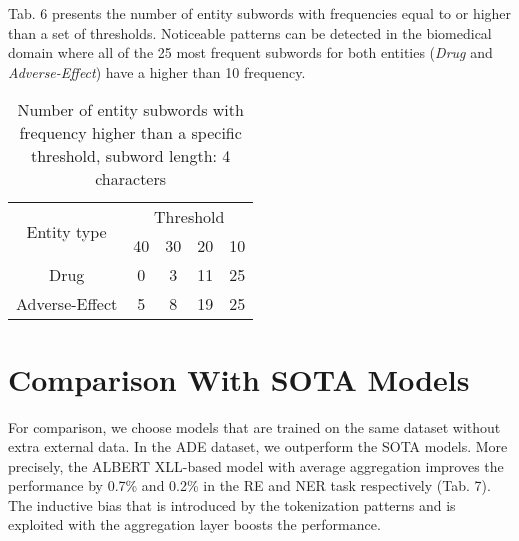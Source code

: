 \documentclass[runningheads]{llncs}
\begin{document}
Tab. 6 presents the number of entity subwords with frequencies equal to or higher than a set of thresholds. Noticeable patterns can be detected in the biomedical domain where all of the 25 most frequent subwords for both entities (\textit{Drug} and \textit{Adverse-Effect}) have a higher than 10 frequency.


\begin{table}[!h]
    \vspace{-5mm}
    \caption{Number of entity subwords with frequency higher than a specific threshold, subword length: 4 characters}
    \vspace{-3mm}
    \centering
    \begin{tabular}{ccccc}
        \toprule
        \multirow{2}{*}{Entity type} & \multicolumn{4}{c}{Threshold} \\
        \cmidrule{2-5}
        &  40 &  30 &  20 &  10 \\
        \midrule
        Drug & 0 & 3 & 11 & 25 \\
        Adverse-Effect & 5 & 8 & 19 & 25 \\
        \bottomrule
    \end{tabular}
    \vspace{-9mm}
\end{table}

\section{Comparison With SOTA Models}
\vspace{-2mm}
For comparison, we choose models that are trained on the same dataset without extra external data. In the ADE dataset, we outperform the SOTA models. More precisely, the ALBERT XLL-based model with average aggregation improves the performance by 0.7\% and 0.2\% in the RE and NER task respectively (Tab. 7). The inductive bias that is introduced by the tokenization patterns and is exploited with the aggregation layer boosts the performance. 
\end{document}
